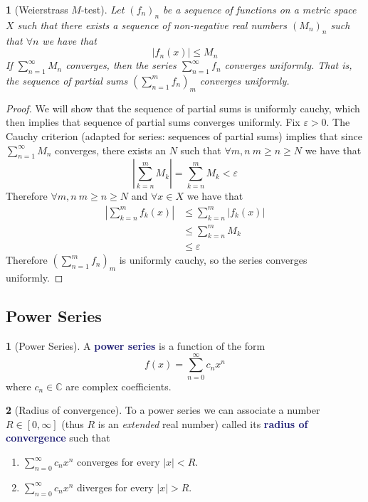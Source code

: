 \documentclass[11pt]{article}
\numberwithin{equation}{section}
\newcommand{\navy}[1]{\textcolor{MidnightBlue}{\bf #1}}
\theoremstyle{plain}
\newtheorem{theorem}{\color{ForestGreen}{\textbf{Theorem}}}[section]
\theoremstyle{definition}
\newtheorem{definition}{\color{MidnightBlue}{\textbf{Definition}}}[section]
\newcommand\abs[1]{\left| #1 \right|}
\newcommand{\1}{\mathbbm 1}
\newcommand{\e}{\varepsilon}
\newcommand{\CC}{\mathbb C}
\begin{document}
\begin{theorem}[Weierstrass $M$-test]
	Let $(f_n)_n$ be a sequence of functions on a metric space $X$ such that there exists a sequence of non-negative real numbers $(M_n)_n$ such that $\forall n$ we have that
	\begin{equation}
		|f_n(x)| \leq M_n 
	\end{equation}
	If $\sum_{n=1}^\infty M_n$ converges, then the series $\sum_{n=1}^\infty f_n$ converges uniformly. That is, the sequence of partial sums $\left(\sum_{n=1}^m f_n\right)_m$ converges uniformly.  
\end{theorem}
\begin{proof}
	We will show that the sequence of partial sums is uniformly cauchy, which then implies that sequence of partial sums converges uniformly. Fix $\e > 0$. The Cauchy criterion (adapted for series: sequences of partial sums) implies that since $\sum_{n=1}^\infty M_n$ converges, there exists an $N$ such that $\forall m,n \ m\geq n\geq N$ we have that
	\begin{equation*}
		\abs{\sum_{k=n}^m M_k} = \sum_{k=n}^m M_k  < \e
	\end{equation*}
	Therefore $\forall m,n \ m\geq n\geq N$ and $\forall x \in X$ we have that
	\begin{align*}
		\abs{\sum_{k=n}^m f_k(x)} &\leq \sum_{k=n}^m \abs{f_k(x)} \tag{$\Delta$} \\
		&\leq \sum_{k=n}^m M_k \\
		&\leq \e
	\end{align*}
	Therefore $\left(\sum_{n=1}^m f_n\right)_m$ is uniformly cauchy, so the series converges uniformly. 
\end{proof}

\subsection{Power Series}

\begin{definition}[Power Series]
	A \navy{power series} is a function of the form
	\begin{equation}
		f(x) = \sum_{n=0}^\infty c_n x^n
	\end{equation}
	where $c_n \in \CC$ are complex coefficients. 
\end{definition}

\begin{definition}[Radius of convergence]
	To a power series we can associate a number $R \in [0, \infty]$ (thus $R$ is an \emph{extended} real number) called its \navy{radius of convergence} such that  
	\begin{enumerate}
		\item $\sum_{n=0}^\infty c_n x^n$ converges for every $|x| < R$.
		\item $\sum_{n=0}^\infty c_n x^n$ diverges for every $|x| > R$.
	\end{enumerate}
\end{definition}
\end{document}
